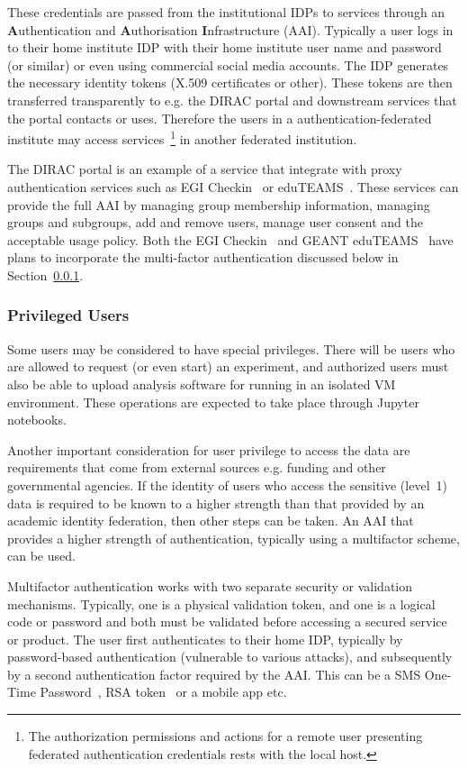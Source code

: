 \documentclass[12pt,a4paper]{article}
\begin{document}
These credentials are passed from the institutional IDPs to services 
through an {\bf A}uthentication and {\bf A}uthorisation {\bf I}nfrastructure (AAI).
Typically a user logs in to their home institute IDP with their home institute user name and password (or similar) or even using commercial social media accounts.
The IDP generates the necessary identity tokens (X.509 certificates or other).  
These tokens are then transferred transparently to e.g. the DIRAC portal and downstream services that the portal contacts or uses.
Therefore the users in a authentication-federated institute may access services~\footnote{The authorization permissions and actions for a remote user presenting federated authentication credentials rests with the local host.} in another federated institution.

The DIRAC portal is an example of a service that integrate with proxy authentication services such as EGI Checkin~\cite{egi-checkin} or eduTEAMS~\cite{eduteams}.
These services can provide the full AAI by managing group membership information, managing groups and subgroups, add and remove users, manage user consent and the acceptable usage policy.
Both the EGI Checkin~\cite{egi-checkin} and GEANT eduTEAMS~\cite{eduteams} have plans to incorporate the multi-factor authentication discussed below in Section~\ref{ssec:high}.

\subsubsection{Privileged Users}
\label{ssec:high}

Some \EC users may be considered to have special privileges. 
There will be users who are allowed to request (or even start) an experiment, and authorized users must also be able to upload analysis software for running in an isolated VM environment. These operations are expected to take place through Jupyter~\cite{jupyter} notebooks.

Another important consideration for user privilege to access the \ED data are requirements that come from external sources e.g. funding and other governmental agencies.
If the identity of users who access the sensitive (level~1) \ED data is required to be known to a higher strength than that provided by an academic identity federation, then other steps can be taken.
An AAI that provides a higher strength of authentication, typically using a multifactor scheme, can be used.

Multifactor authentication works with two separate security or validation mechanisms. 
Typically, one is a physical validation token, and one is a logical code or password and both must be validated before accessing a secured service or product.
The user first authenticates to their home IDP, typically by password-based authentication (vulnerable to various attacks), and subsequently by a second authentication factor required by the AAI.
This can be a SMS One-Time Password~\cite{otp}, RSA token~\cite{rsa-token} or a mobile app etc.
\end{document}
